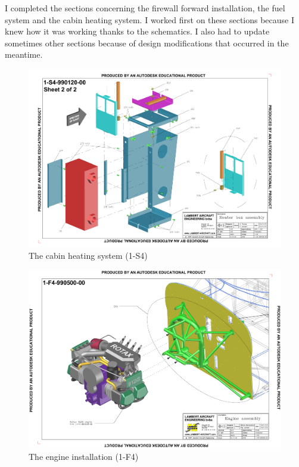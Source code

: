 \documentclass[11pt,a4paper]{article}
\begin{document}
\newpage

I completed the sections concerning the firewall forward installation, the fuel system and the cabin heating system. I worked first on these sections because I knew how it was working thanks to the schematics. I also had to update sometimes other sections because of design modifications that occurred in the meantime.

\begin{figure}[ht!]
	\begin{center}
		\includegraphics[width=13cm,trim = 1.5cm 1cm 1.5cm 1cm, clip]{pics/PIC013.pdf}
		\caption{The cabin heating system (1-S4)}
		\label{fig:PIC013}
	\end{center}
\end{figure}

\begin{figure}[ht!]
	\begin{center}
		\includegraphics[width=13cm,trim = 1.5cm 0.5cm 1cm 1cm, clip]{pics/PIC014.pdf}
		\caption{The engine installation (1-F4)}
		\label{fig:PIC014}
	\end{center}
\end{figure}
\end{document}
